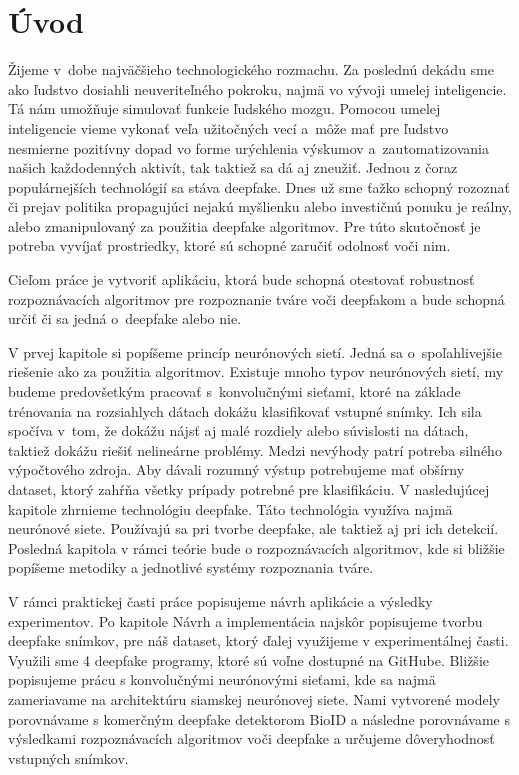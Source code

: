 
%

\chapter{Úvod}
Žijeme v~dobe najväčšieho technologického rozmachu. Za poslednú dekádu sme ako ľudstvo dosiahli neuveriteľného pokroku, najmä vo vývoji umelej inteligencie. Tá nám umožňuje simulovať funkcie ľudského mozgu. Pomocou umelej inteligencie vieme vykonať veľa užitočných vecí a~môže mať pre ľudstvo nesmierne pozitívny dopad vo forme urýchlenia výskumov a~zautomatizovania našich každodenných aktivít, tak taktiež sa dá aj zneužiť. Jednou z čoraz populárnejších technológií sa stáva deepfake. Dnes už sme ťažko schopný rozoznať či prejav politika propagujúci nejakú myšlienku alebo investičnú ponuku je reálny, alebo zmanipulovaný za použitia deepfake algoritmov. Pre túto skutočnosť je potreba vyvíjať prostriedky, ktoré sú schopné zaručiť odolnosť voči nim.

Cieľom práce je vytvoriť aplikáciu, ktorá bude schopná otestovať robustnosť rozpoznávacích algoritmov pre rozpoznanie tváre voči deepfakom a bude schopná určiť či sa jedná o~deepfake alebo nie. 

V prvej kapitole si popíšeme princíp neurónových sietí. Jedná sa o~spoľahlivejšie riešenie ako za použitia algoritmov. Existuje mnoho typov neurónových sietí, my budeme predovšetkým pracovať s~konvolučnými sieťami, ktoré na základe trénovania na rozsiahlych dátach dokážu klasifikovať vstupné snímky. Ich sila spočíva v~tom, že dokážu nájsť aj malé rozdiely alebo súvislosti na dátach, taktiež dokážu riešiť nelineárne problémy. Medzi nevýhody patrí potreba silného výpočtového zdroja. Aby dávali rozumný výstup potrebujeme mať obšírny dataset, ktorý zahŕňa všetky prípady potrebné pre klasifikáciu. V nasledujúcej kapitole zhrnieme technológiu deepfake. Táto technológia využíva najmä neurónové siete. Používajú sa pri tvorbe deepfake, ale taktiež aj pri ich detekcií. Posledná kapitola v rámci teórie bude o rozpoznávacích algoritmov, kde si bližšie popíšeme metodiky a jednotlivé systémy rozpoznania tváre.

V rámci praktickej časti práce popisujeme návrh aplikácie a výsledky experimentov. Po kapitole Návrh a implementácia najskôr popisujeme tvorbu deepfake snímkov, pre náš dataset, ktorý ďalej využijeme v experimentálnej časti. Využili sme 4 deepfake programy, ktoré sú voľne dostupné na GitHube. Bližšie popisujeme prácu s konvolučnými neurónovými sieťami, kde sa najmä zameriavame na architektúru siamskej neurónovej siete. Nami vytvorené modely porovnávame s komerčným deepfake detektorom BioID a následne porovnávame s výsledkami rozpoznávacích algoritmov voči deepfake a určujeme dôveryhodnosť vstupných snímkov.

